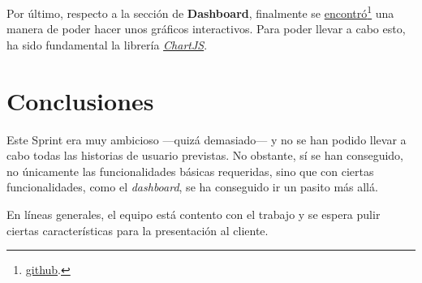 \documentclass[12pt, a4paper, twoside]{article} %
\newcommand{\B}[1]{\textbf{#1}}
\newcommand{\ti}{\emph} %
\newcommand{\fn}{\footnote}
\begin{document}
Por último, respecto a la sección de \B{Dashboard}, finalmente se \href{https://youtu.be/I8E9XszUYGY}{encontró}\fn{\href{https://github.com/ajscriptmedia/odoo_custom_dashboard/tree/orm_action_service}{github}.} una manera de poder hacer unos gráficos interactivos. Para poder llevar a cabo esto, ha sido fundamental la librería \href{https://www.chartjs.org/}\ti{ChartJS}.

\section*{Conclusiones}
Este Sprint era muy ambicioso ---quizá demasiado--- y no se han podido llevar a cabo todas las historias  de usuario previstas. No obstante, sí se han conseguido, no únicamente las funcionalidades básicas requeridas, sino que con ciertas funcionalidades, como el \ti{dashboard}, se ha conseguido ir un pasito más allá. 

En líneas generales, el equipo está contento con el trabajo y se espera pulir ciertas características para la presentación al cliente.
\end{document}
